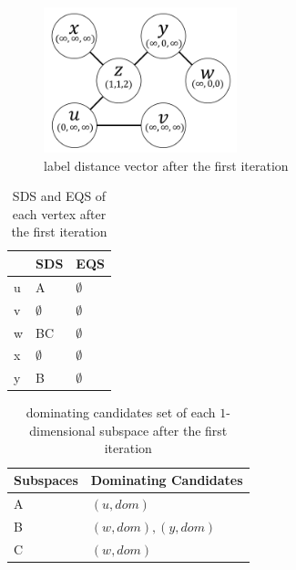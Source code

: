 \begin{figure}[h]
    \centering
    \includegraphics[width=0.5\textwidth]{figs/graph_example_1}
    \caption{\label{font-figure}label distance vector after the first iteration}
    \label{fig:cand_step1}
\end{figure}


\begin{table}[h]
    \centering
    \begin{tabular}{|l|l|l|}
    \hline
      & SDS         & EQS         \\ \hline
    u & A           & $\emptyset$ \\ \hline
    v & $\emptyset$ & $\emptyset$ \\ \hline
    w & BC          & $\emptyset$ \\ \hline
    x & $\emptyset$ & $\emptyset$ \\ \hline
    y & B           & $\emptyset$ \\ \hline
    \end{tabular}
    \caption{\label{font-table}SDS and EQS of each vertex after the first iteration}
\end{table}

\begin{table}[h]
    \centering

    \begin{tabular}{|l|l|}
    \hline
    Subspaces & Dominating Candidates \\ \hline
    A         & $(u, dom)$            \\ \hline
    B         & $(w, dom), (y, dom)$            \\ \hline
    C         & $(w, dom)$            \\ \hline
    \end{tabular}
    \caption{\label{font-table}dominating candidates set of each $1$-dimensional subspace after the first iteration}
\end{table}

